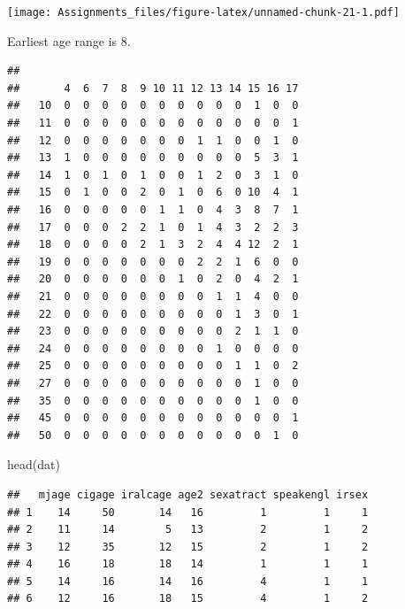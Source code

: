 \documentclass[
]{article}
\newenvironment{Shaded}{\begin{snugshade}}{\end{snugshade}}
\newcommand{\FunctionTok}[1]{\textcolor[rgb]{0.00,0.00,0.00}{#1}}
\newcommand{\NormalTok}[1]{#1}
\newcommand{\SpecialCharTok}[1]{\textcolor[rgb]{0.00,0.00,0.00}{#1}}
\begin{document}
\texttt{[image: Assignments\_files/figure-latex/unnamed-chunk-21-1.pdf]}

Earliest age range is 8.

\begin{Shaded}
\end{Shaded}

\begin{verbatim}
##     
##       4  6  7  8  9 10 11 12 13 14 15 16 17
##   10  0  0  0  0  0  0  0  0  0  0  1  0  0
##   11  0  0  0  0  0  0  0  0  0  0  0  0  1
##   12  0  0  0  0  0  0  0  1  1  0  0  1  0
##   13  1  0  0  0  0  0  0  0  0  0  5  3  1
##   14  1  0  1  0  1  0  0  1  2  0  3  1  0
##   15  0  1  0  0  2  0  1  0  6  0 10  4  1
##   16  0  0  0  0  0  1  1  0  4  3  8  7  1
##   17  0  0  0  2  2  1  0  1  4  3  2  2  3
##   18  0  0  0  0  2  1  3  2  4  4 12  2  1
##   19  0  0  0  0  0  0  0  2  2  1  6  0  0
##   20  0  0  0  0  0  0  1  0  2  0  4  2  1
##   21  0  0  0  0  0  0  0  0  1  1  4  0  0
##   22  0  0  0  0  0  0  0  0  0  1  3  0  1
##   23  0  0  0  0  0  0  0  0  0  2  1  1  0
##   24  0  0  0  0  0  0  0  0  1  0  0  0  0
##   25  0  0  0  0  0  0  0  0  0  1  1  0  2
##   27  0  0  0  0  0  0  0  0  0  0  1  0  0
##   35  0  0  0  0  0  0  0  0  0  0  1  0  0
##   45  0  0  0  0  0  0  0  0  0  0  0  0  1
##   50  0  0  0  0  0  0  0  0  0  0  0  1  0
\end{verbatim}

\begin{Shaded}
\begin{Highlighting}[]
\FunctionTok{head}\NormalTok{(dat)}
\end{Highlighting}
\end{Shaded}

\begin{verbatim}
##   mjage cigage iralcage age2 sexatract speakengl irsex
## 1    14     50       14   16         1         1     1
## 2    11     14        5   13         2         1     2
## 3    12     35       12   15         2         1     2
## 4    16     18       18   14         1         1     1
## 5    14     16       14   16         4         1     1
## 6    12     16       18   15         4         1     2
\end{verbatim}
\end{document}
